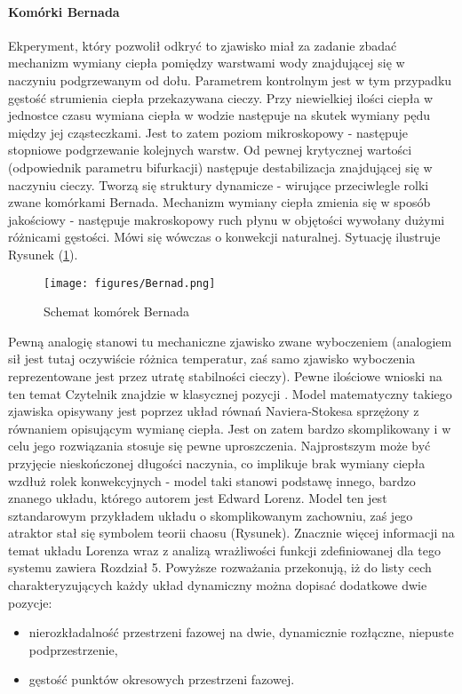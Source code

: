 \documentclass[12pt]{article}
\begin{document}
\paragraph{Komórki Bernada}
Ekperyment, który pozwolił odkryć to zjawisko miał za zadanie zbadać mechanizm wymiany ciepła pomiędzy warstwami wody znajdującej się w naczyniu podgrzewanym od dołu. Parametrem kontrolnym jest w tym przypadku gęstość strumienia ciepła przekazywana cieczy. Przy niewielkiej ilości ciepła w jednostce czasu wymiana ciepła w wodzie następuje na skutek wymiany pędu między jej cząsteczkami. Jest to zatem poziom mikroskopowy - następuje stopniowe podgrzewanie kolejnych warstw. Od pewnej krytycznej wartości (odpowiednik parametru bifurkacji) następuje destabilizacja znajdującej się w naczyniu cieczy. Tworzą się struktury dynamicze - wirujące przeciwlegle rolki zwane komórkami Bernada. Mechanizm wymiany ciepła zmienia się w sposób jakościowy - następuje makroskopowy ruch płynu w objętości wywołany dużymi różnicami gęstości. Mówi się wówczas o konwekcji naturalnej. Sytuację ilustruje Rysunek (\ref{Fig12}).
\begin{figure}[H]
	\texttt{[image: figures/Bernad.png]} 
	\centering
	\caption{Schemat komórek Bernada}
	\label{Fig12}
\end{figure}
Pewną analogię stanowi tu mechaniczne zjawisko zwane wyboczeniem (analogiem sił jest tutaj oczywiście różnica temperatur, zaś samo zjawisko wyboczenia reprezentowane jest przez utratę stabilności cieczy). Pewne ilościowe wnioski na ten temat Czytelnik znajdzie w klasycznej pozycji \cite{Landau}.\newline
Model matematyczny takiego zjawiska opisywany jest poprzez układ równań Naviera-Stokesa sprzężony z równaniem opisującym wymianę ciepła. Jest on zatem bardzo skomplikowany i w celu jego rozwiązania stosuje się pewne uproszczenia. Najprostszym może być przyjęcie nieskończonej długości naczynia, co implikuje brak wymiany ciepła wzdłuż rolek konwekcyjnych - model taki stanowi podstawę innego, bardzo znanego układu, którego autorem jest Edward Lorenz. Model ten jest sztandarowym przykładem układu o skomplikowanym zachowniu, zaś jego atraktor stał się symbolem teorii chaosu (Rysunek). Znacznie więcej informacji na temat układu Lorenza wraz z analizą wrażliwości funkcji zdefiniowanej dla tego systemu zawiera Rozdział 5.\newline
Powyższe rozważania przekonują, iż do listy cech charakteryzujących każdy układ dynamiczny można dopisać dodatkowe dwie pozycje:
\begin{itemize}
	\item nierozkładalność przestrzeni fazowej na dwie, dynamicznie rozłączne, niepuste podprzestrzenie,
	\item gęstość punktów okresowych przestrzeni fazowej.
\end{itemize}
\end{document}
